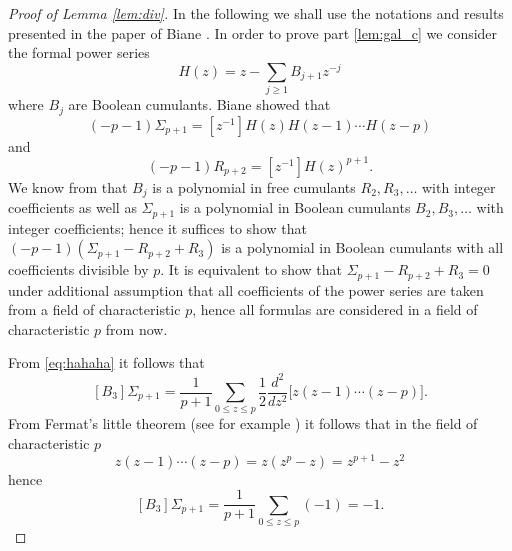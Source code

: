 \documentclass[12pt]{amsart}
\theoremstyle{plain}
\theoremstyle{remark}
\begin{document}
\begin{proof}[Proof of Lemma \ref{lem:div}]
In the following we shall use the notations and results presented in the paper
of Biane  \cite{Biane2003}. In order to prove part \ref{lem:gal_c} we consider
the formal power
series 
$$ H(z) = z-\sum_{j\geq 1} {B}_{j+1}z^{-j}$$ 
where ${B}_{j}$ are Boolean cumulants. Biane showed that
\begin{equation}
\label{eq:hahaha}
(-p-1)\Sigma_{p+1} =
[z^{-1}]H(z)H(z-1)\cdots H(z-p)
\end{equation}
and 
$$(-p-1) {R}_{p+2} =  [z^{-1}]H(z)^{p+1}.$$
We know from \cite{Biane2003} that $B_j$ is a polynomial in free cumulants
$R_2,R_3,\dots$ with integer coefficients as well as $\Sigma_{p+1}$ is a
polynomial in Boolean cumulants $B_2,B_3,\dots$ with integer coefficients; hence
it suffices to show that $(-p-1)(\Sigma_{p+1}-R_{p+2}+R_3)$ is a polynomial in
Boolean cumulants with all coefficients divisible by $p$. It is equivalent to
show that $\Sigma_{p+1}-R_{p+2}+R_3=0$ under additional assumption
that all coefficients of the power series are taken from a field of
characteristic $p$, hence all formulas are considered in a field of
characteristic $p$ from now. 

From \eqref{eq:hahaha} it follows that 
$$ [B_3] \Sigma_{p+1} = \frac{1}{p+1} \sum_{0\leq z \leq p}
\frac{1}{2} \frac{d^2}{dz^2} 
\big[ z (z-1) \cdots (z-p) \big]. $$
From Fermat's little theorem (see for example \cite{GrahamKnuthPatashnik}) it
follows that in the field of characteristic $p$
$$ z (z-1) \cdots (z-p) = z (z^p-z)=z^{p+1}-z^2 $$
hence
\begin{equation}
\label{eq:B3}
 [B_3] \Sigma_{p+1} = \frac{1}{p+1} \sum_{0\leq z \leq p} (-1)=-1. 
\end{equation}


\end{proof}
\end{document}

